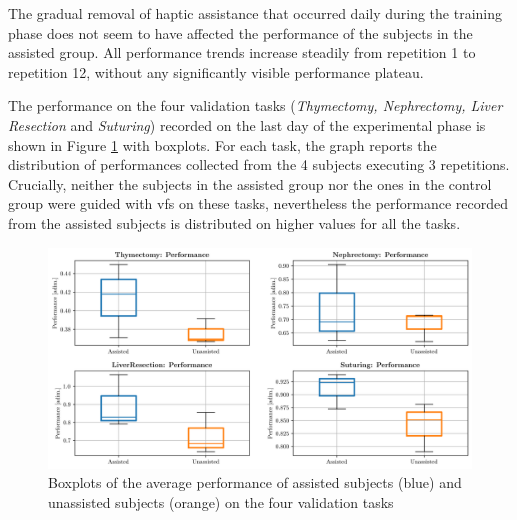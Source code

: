 \documentclass[../main.tex]{subfiles}
\begin{document}
The gradual removal of haptic assistance that occurred daily during the training phase does not seem to have affected the performance of the subjects in the assisted group. All performance trends increase steadily from repetition 1 to repetition 12, without any significantly visible performance plateau. 

The performance on the four validation tasks (\textit{Thymectomy, Nephrectomy, Liver Resection} and \textit{Suturing}) recorded on the last day of the experimental phase is shown in Figure \ref{fig:performancevalidation} with boxplots. For each task, the graph reports the distribution of performances collected from the 4 subjects executing 3 repetitions. Crucially, neither the subjects in the assisted group nor the ones in the control group were guided with \acp{vf} on these tasks, nevertheless the performance recorded from the assisted subjects is distributed on higher values for all the tasks. 

\begin{figure}
    \centering
    \includegraphics[width=\textwidth]{images/performance_validation.png}
    \caption{Boxplots of the average performance of assisted subjects (blue) and unassisted subjects (orange) on the four validation tasks}
    \label{fig:performancevalidation}
\end{figure}
\end{document}
